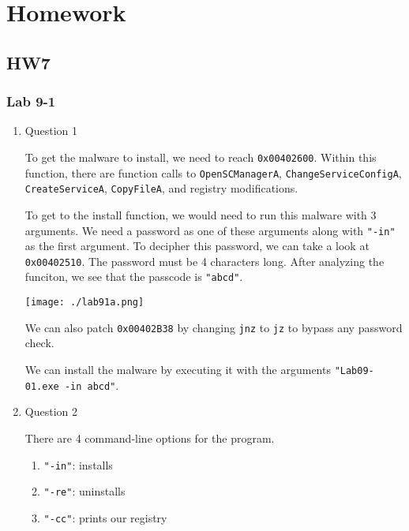\documentclass[11pt]{article}
\author{Andrew Park}
\date{\today}
\title{}
\begin{document}
\tableofcontents

\section{Homework}
\label{sec:orgcb2a029}
\subsection{HW7}
\label{sec:org6be643e}
\subsubsection{Lab 9-1}
\label{sec:org929cb56}
\begin{enumerate}
\item Question 1
\label{sec:orgf982016}

To get the malware to install, we need to reach \texttt{0x00402600}. Within this function, there are function calls to \texttt{OpenSCManagerA}, \texttt{ChangeServiceConfigA}, \texttt{CreateServiceA}, \texttt{CopyFileA}, and registry modifications. 

To get to the install function, we would need to run this malware with 3 arguments. We need a password as one of these arguments along with \texttt{"-in"} as the first argument. To decipher this password, we can take a look at \texttt{0x00402510}. The password must be 4 characters long. After analyzing the funciton, we see that the passcode is \texttt{"abcd"}. 

\begin{center}
\texttt{[image: ./lab91a.png]}
\end{center}

We can also patch \texttt{0x00402B38} by changing \texttt{jnz} to \texttt{jz} to bypass any password check.

We can install the malware by executing it with the arguments \texttt{"Lab09-01.exe -in abcd"}.

\item Question 2
\label{sec:org6967eaa}

There are 4 command-line options for the program.

\begin{enumerate}
\item \texttt{"-in"}: installs

\item \texttt{"-re"}: uninstalls

\item \texttt{"-cc"}: prints our registry


\end{enumerate}
\end{enumerate}
\end{document}
